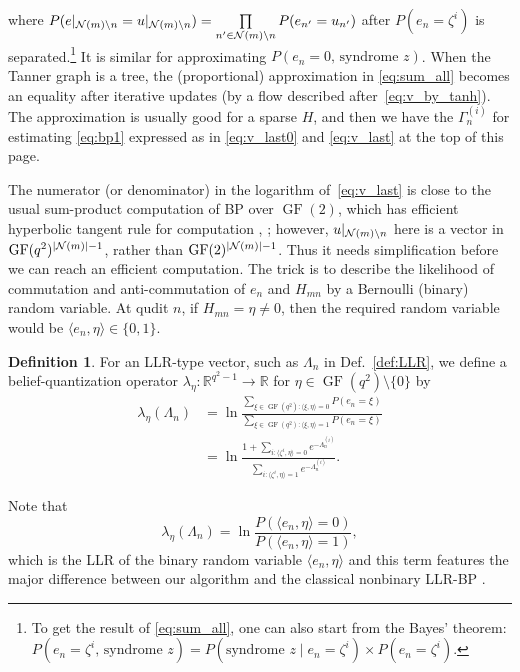 \documentclass{ieeeaccess}
\DeclareMathOperator{\GF}{GF}
\newcommand{\sN}{{\cal N}}
\newcommand{\RR}{{\mathbb R}}
\theoremstyle{definition}		%
\newtheorem{definition}{Definition}
\begin{document}
\normalsize
where ${ P(e|_{\sN(m)\setminus n}=u|_{\sN(m)\setminus n}) = \textstyle \prod\limits_{n'\in\sN(m)\setminus n} P(e_{n'}=u_{n'}) }$ %
after $P(e_n=\zeta^i)$ is separated.\footnote{
	 To get the result of \eqref{eq:sum_all}, one can also start from the Bayes' theorem: 
		${ P(e_n=\zeta^i,\, \text{syndrome } z) = P(\text{syndrome } z \mid e_n=\zeta^i) \times P(e_n=\zeta^i) }$.
	}
It is similar for approximating ${ P(e_n=0,\, \text{syndrome } z) }$.
%
When the Tanner graph is a tree, 
the (proportional) approximation in \eqref{eq:sum_all} becomes an equality after iterative updates (by a flow described after~\eqref{eq:v_by_tanh}).
%
The approximation is usually good for a sparse $H$, and then we have
the $\Gamma_{n}^{(i)}$ for estimating \eqref{eq:bp1} expressed as in \eqref{eq:v_last0} and \eqref{eq:v_last} at the top of this page.

\setcounter{equation}{19}				%




The numerator (or denominator) in the logarithm of~\eqref{eq:v_last} is close to the usual sum-product computation of BP over $\GF(2)$, which has efficient hyperbolic tangent rule for computation \cite{Gal63}, \cite[Sec.~2.5.2]{RU08}; 
however, $u|_{\sN(m)\setminus n}$ here is a vector in $\GF(q^2)^{|\sN(m)|-1}$, rather than $\GF(2)^{|\sN(m)|-1}$.
Thus it needs simplification before we can reach an efficient computation.
%
The trick is to describe the likelihood of commutation and anti-commutation of $e_n$ and $H_{mn}$ by a Bernoulli (binary) random variable.
At qudit $n$, if $H_{mn}=\eta\ne 0$, then the required random variable would be $\langle e_n, \eta \rangle \in\{0,1\}$.


\begin{definition} \label{def:la}
For an LLR-type vector, such as $\Lambda_n$ in Def.~\ref{def:LLR}, %
we define a belief-quantization operator $\lambda_\eta:\RR^{q^2-1}\rightarrow \RR$  for $\eta\in { \GF(q^2)\setminus\{0\} }$ by
 \begin{equation} \label{eq:la}
 \begin{aligned}
 \lambda_{\eta}(\Lambda_n) 
 &= \ln\frac{ \sum_{\xi\in\GF(q^2): \langle \xi,\eta \rangle = 0} P(e_n=\xi) }{ \sum_{\xi\in\GF(q^2): \langle \xi,\eta \rangle = 1} P(e_n=\xi) }\\
 &= \ln\frac{ 1 + \sum_{i: \langle \zeta^i,\eta \rangle = 0} e^{-\Lambda_n^{(i)}} }{ \sum_{i: \langle \zeta^i,\eta \rangle = 1} e^{-\Lambda_n^{(i)}} }.
 \end{aligned}
 \end{equation}
\end{definition}
%
%
Note that 
\begin{equation} \label{eq:la_1}
\lambda_{\eta}(\Lambda_n) = \ln\frac{ P(\langle e_n, \eta \rangle = 0) }{ P(\langle e_n,\eta \rangle = 1) }, 
\end{equation}
which is the LLR of the binary random variable  $\langle e_n, \eta \rangle$
and this term features the major difference  between our algorithm and the classical nonbinary LLR-BP \cite{WSM04}.
\end{document}
